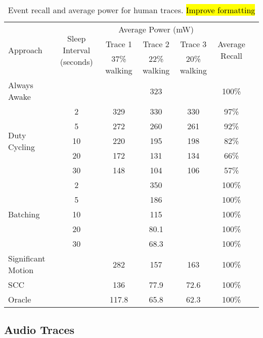 \begin{table*}[t]
\centering
{\small
    \begin{tabular}{|l|c|c|c|c|c|c|}
    \hline
	\multirow{3}{*}{Approach}		& \multirow{3}{*}{\parbox{1.9cm}{Sleep Interval (seconds)}}
												& \multicolumn{3}{c|}{Average Power (mW)}
																								& \multirow{3}{*}{\parbox{1.5cm}{Average Recall}} \\ \cline{3-5}
									&			& Trace 1		& Trace 2		& Trace 3 		& 							\\ 
									&			& 37\% walking	& 22\% walking	& 20\% walking	& \\ \hline
	Always Awake					& 			& \multicolumn{3}{c|}{323} 						& 100\% \\ \hline
	\multirow{5}{*}{Duty Cycling}	& 2			& 329			& 330			& 330			& 97\%	\\ \cline{2-6}
									& 5			& 272			& 260			& 261			& 92\%	\\ \cline{2-6}
									& 10		& 220			& 195			& 198			& 82\%	\\ \cline{2-6}
									& 20		& 172			& 131			& 134			& 66\%	\\ \cline{2-6}
									& 30		& 148			& 104			& 106			& 57\%	\\ \hline
	\multirow{5}{*}{Batching}		& 2			& \multicolumn{3}{c|}{350} 						& 100\% \\ \cline{2-6}
									& 5			& \multicolumn{3}{c|}{186} 						& 100\% \\ \cline{2-6}
	 								& 10		& \multicolumn{3}{c|}{115} 						& 100\% \\ \cline{2-6}
	 								& 20		& \multicolumn{3}{c|}{80.1} 					& 100\% \\ \cline{2-6}
	 								& 30		& \multicolumn{3}{c|}{68.3} 					& 100\% \\ \hline
	Significant Motion				&			& 282			& 157			& 163			& 100\% \\ \hline
	SCC								&			& 136			& 77.9			& 72.6			& 100\% \\ \hline
	Oracle							&			& 117.8			& 65.8			& 62.3			& 100\% \\ \hline



    \end{tabular}
}
	\caption{Event recall and average power for human traces. \hl{Improve formatting}}
	\label{table:macrobenchmarksAccel}
\end{table*}


\subsection{Audio Traces}

